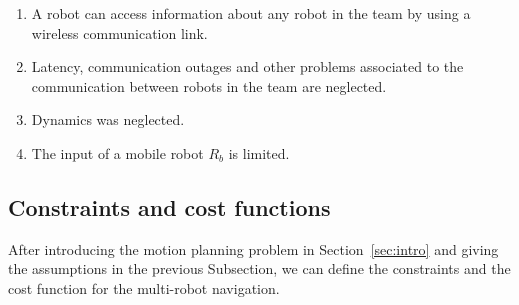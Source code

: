 \documentclass[eprint]{actapoly}
\begin{document}
\begin{enumerate}
    \item A robot can access 
    information about any robot in the team by using 
    a wireless communication link.
    
    \item Latency, communication outages and other problems associated
    to the communication between robots in the team are neglected.
        
    \item Dynamics was neglected.
    
    \item The input of a mobile robot $R_b$ is limited.
    

%    

\end{enumerate}

\subsection{Constraints and cost functions}

After introducing the motion planning problem in
Section~\ref{sec:intro} and giving the assumptions in the previous Subsection,
we can define the constraints and the cost function for the
multi-robot navigation.
\end{document}
